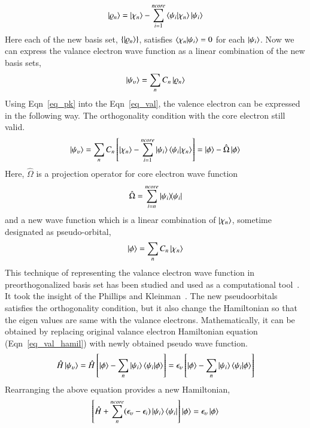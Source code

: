 \begin{equation}
\label{eq_pk}
\ket{\varrho_n} = \ket{\chi_n} - \sum^{ncore}_{i=1} \braket{\psi_i}{\chi_n}\ket{\psi_i}
\end{equation}
Here each of the new basis set, $\{\ket{\varrho_n}\}$, satisfies $\braket{\chi_n}{\psi_i} = 0$ for each $\ket{\psi_i}$. Now we can express the valance electron wave function as a linear combination of the new basis sets,
\begin{equation}
\label{eq_val}
\ket{\psi_{\upsilon}} = \sum_n C_n \ket{\varrho_n} 
\end{equation}
Using Eqn~\ref{eq_pk} into the Eqn~\ref{eq_val}, the valence electron can be expressed in the following way. The orthogonality condition with the core electron still valid.
\begin{equation}
\ket{\psi_{\upsilon}} = \sum_n C_n \left [ \ket{\chi_n} - \sum_{i=1}^{ncore} \ket{\psi_i}\braket{\psi_i}{\chi_n} \right ] = \ket{\phi} - \hat{\Omega}\ket{\phi}
\end{equation}
Here, $\hat{\Omega}$ is a projection operator for core electron wave function
\begin{equation}
\label{eq_projection}
\hat{\Omega} = \sum_{i=n}^{ncore} \dyad{\psi_i}{\psi_i}
\end{equation}
and a new wave function which is a linear combination of $\ket{\chi_n}$, sometime designated as pseudo-orbital,
\begin{equation}
\label{eq_pseudoorbital}
\ket{\phi} = \sum_n C_n \ket{\chi_n}
\end{equation}
This technique of representing the valance electron wave function in preorthogonalized basis set has been studied and used as a computational tool~\cite{herring1940new}. It took the insight of the Phillips and Kleinman~\cite{phillips1959new}. The new pseudoorbitals satisfies the orthogonality condition, but it also change the Hamiltonian so that the eigen values are same with the valance electrons. Mathematically, it can be obtained by replacing original valance electron Hamiltonian equation (Eqn~\ref{eq_val_hamil}) with newly obtained pseudo wave function.
\begin{equation}
\label{eq_ps_pot}
\hat{H}\ket{\psi_{\upsilon}} = \hat{H} \left [ \ket{\phi} - \sum_n \ket{\psi_i}\braket{\psi_i}{\phi} \right ] =\epsilon_{\upsilon} \left [ \ket{\phi} - \sum_n \ket{\psi_i}\braket{\psi_i}{\phi}  \right ] 
\end{equation}
Rearranging the above equation provides a new Hamiltonian,
\begin{equation}
\label{eq_ps_hamil}
\left [ \hat{H} + \sum_n ^{ncore} (\epsilon_{\upsilon} - \epsilon_i)\ket{\psi_i}\bra{\psi_i}\right ]\ket{\phi} = 
\epsilon_{\upsilon}\ket{\phi}
\end{equation}
